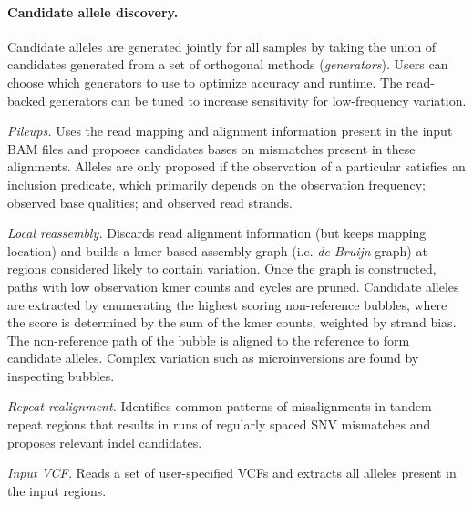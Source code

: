 \documentclass[notitlepage, twocolumn, 10pt]{article}
\begin{document}
\paragraph*{Candidate allele discovery.} Candidate alleles are generated jointly for all samples by taking the union of candidates generated from a set of orthogonal methods (\emph{generators}). Users can choose which generators to use to optimize accuracy and runtime. The read-backed generators can be tuned to increase sensitivity for low-frequency variation.

\vspace{3mm}
\noindent\emph{Pileups.} Uses the read mapping and alignment information present in the input BAM files and proposes candidates bases on mismatches present in these alignments. Alleles are only proposed if the observation of a particular satisfies an inclusion predicate, which primarily depends on the observation frequency; observed base qualities; and observed read strands.

\vspace{3mm}
\noindent\emph{Local reassembly.} Discards read alignment information (but keeps mapping location) and builds a kmer based assembly graph (i.e. \emph{de Bruijn} graph) at regions considered likely to contain variation. Once the graph is constructed, paths with low observation kmer counts and cycles are pruned. Candidate alleles are extracted by enumerating the highest scoring non-reference bubbles, where the score is determined by the sum of the kmer counts, weighted by strand bias. The non-reference path of the bubble is aligned to the reference to form candidate alleles. Complex variation such as microinversions are found by inspecting bubbles.

\vspace{3mm}
\noindent\emph{Repeat realignment.} Identifies common patterns of misalignments in tandem repeat regions that results in runs of regularly spaced SNV mismatches and proposes relevant indel candidates.

\vspace{3mm}
\noindent\emph{Input VCF.} Reads a set of user-specified VCFs and extracts all alleles present in the input regions.
\end{document}
